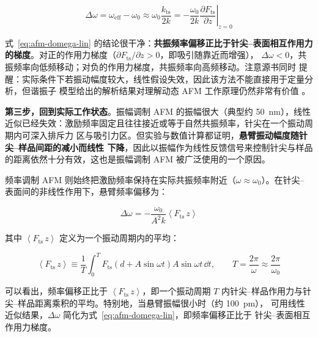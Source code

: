 \begin{equation}\label{eq:afm-domega-lin}
\Delta\omega=\omega_{\mathrm{eff}}-\omega_0\approx\omega_0\frac{k_{\mathrm{ts}}}{2k}
=-\frac{\omega_0}{2k}\left.\frac{\partial F_{\mathrm{ts}}}{\partial z}\right|_{z=0}
\end{equation}

式~\eqref{eq:afm-domega-lin} 的结论很干净：\textbf{共振频率偏移正比于针尖--表面相互作用力
的梯度}。对正的作用力梯度（$\partial F_{\mathrm{ts}}/\partial z>0$，即吸引随靠近而增强），
$\Delta\omega<0$，共振频率向低频移动；对负的作用力梯度，共振频率向高频移动。注意源书同时
提醒：实际条件下若振动幅度较大，线性假设失效，因此该方法不能直接用于定量分析，但谐振子
模型给出的解析结果对理解动态 AFM 工作原理仍然非常有价值
。

\textbf{第三步，回到实际工作状态}。振幅调制 AFM 的振幅很大（典型约 \qty{50}{nm}），线性
近似已经失效：激励频率固定且往往接近或等于自然共振频率，针尖在一个振动周期内可深入排斥力
区与吸引力区。但实验与数值计算都证明，\textbf{悬臂振动幅度随针尖--样品间距的减小而线性
下降}，因此以振幅作为线性反馈信号来控制针尖与样品的距离依然十分有效，这也是振幅调制 AFM
被广泛使用的一个原因。

频率调制 AFM 则始终把激励频率保持在实际共振频率附近（$\omega\approx\omega_0$）。在针尖--
表面间的非线性作用下，悬臂频率偏移为：

\begin{equation}\label{eq:afm-domega-fm}
\Delta\omega=-\frac{\omega_0}{A^{2}k}\left\langle F_{\mathrm{ts}}\,z\right\rangle
\end{equation}

其中 $\left\langle F_{\mathrm{ts}}\,z\right\rangle$ 定义为一个振动周期内的平均：

\begin{equation}\label{eq:afm-fz}
\left\langle F_{\mathrm{ts}}\,z\right\rangle
\equiv\frac{1}{T}\int_{0}^{T}F_{\mathrm{ts}}\left(d+A\sin\omega t\right)A\sin\omega t\,\dd t,
\qquad T=\frac{2\pi}{\omega}\approx\frac{2\pi}{\omega_0}
\end{equation}

可以看出，频率偏移正比于 $\left\langle F_{\mathrm{ts}}\,z\right\rangle$，即一个振动周期 $T$
内针尖--样品作用力与针尖--样品距离乘积的平均。特别地，当悬臂振幅很小时（约 \qty{100}{pm}），
可用线性近似结果，$\Delta\omega$ 简化为式~\eqref{eq:afm-domega-lin}，即频率偏移正比于
针尖--表面相互作用力梯度。

